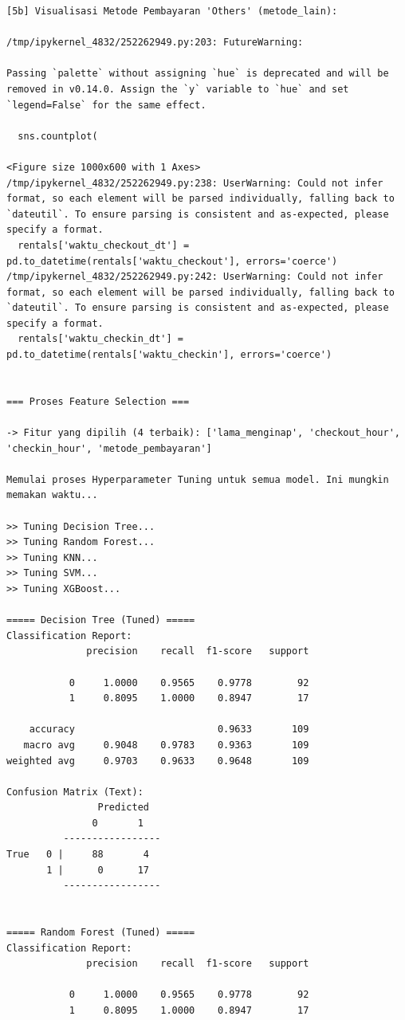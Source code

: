 \begin{lstlisting}[caption={Output 20}]
[5b] Visualisasi Metode Pembayaran 'Others' (metode_lain):

/tmp/ipykernel_4832/252262949.py:203: FutureWarning: 

Passing `palette` without assigning `hue` is deprecated and will be removed in v0.14.0. Assign the `y` variable to `hue` and set `legend=False` for the same effect.

  sns.countplot(

<Figure size 1000x600 with 1 Axes>
/tmp/ipykernel_4832/252262949.py:238: UserWarning: Could not infer format, so each element will be parsed individually, falling back to `dateutil`. To ensure parsing is consistent and as-expected, please specify a format.
  rentals['waktu_checkout_dt'] = pd.to_datetime(rentals['waktu_checkout'], errors='coerce')
/tmp/ipykernel_4832/252262949.py:242: UserWarning: Could not infer format, so each element will be parsed individually, falling back to `dateutil`. To ensure parsing is consistent and as-expected, please specify a format.
  rentals['waktu_checkin_dt'] = pd.to_datetime(rentals['waktu_checkin'], errors='coerce')


=== Proses Feature Selection ===

-> Fitur yang dipilih (4 terbaik): ['lama_menginap', 'checkout_hour', 'checkin_hour', 'metode_pembayaran']

Memulai proses Hyperparameter Tuning untuk semua model. Ini mungkin memakan waktu...

>> Tuning Decision Tree...
>> Tuning Random Forest...
>> Tuning KNN...
>> Tuning SVM...
>> Tuning XGBoost...

===== Decision Tree (Tuned) =====
Classification Report:
              precision    recall  f1-score   support

           0     1.0000    0.9565    0.9778        92
           1     0.8095    1.0000    0.8947        17

    accuracy                         0.9633       109
   macro avg     0.9048    0.9783    0.9363       109
weighted avg     0.9703    0.9633    0.9648       109

Confusion Matrix (Text):
                Predicted
               0       1
          -----------------
True   0 |     88       4
       1 |      0      17
          -----------------


===== Random Forest (Tuned) =====
Classification Report:
              precision    recall  f1-score   support

           0     1.0000    0.9565    0.9778        92
           1     0.8095    1.0000    0.8947        17


\end{lstlisting}
